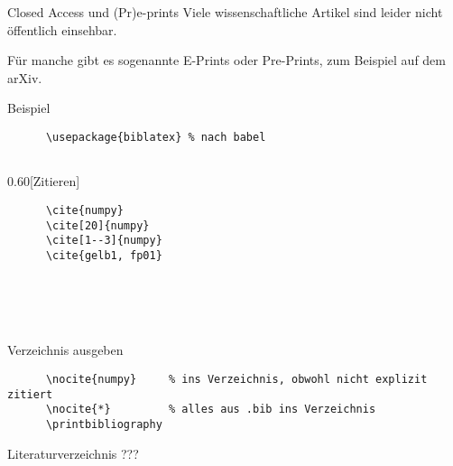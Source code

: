 \begin{frame}[fragile]{Closed Access und (Pr)e-prints}
  Viele wissenschaftliche Artikel sind leider nicht öffentlich einsehbar.

  Für manche gibt es sogenannte E-Prints oder Pre-Prints, zum Beispiel auf dem arXiv.

  \begin{block}{Beispiel}
    \footnotesize
    
  \end{block}

\end{frame}

\begin{frame}[fragile]{%
  \BibLaTeX{}%
  \hfill%
}
  \begin{Packages}
    \begin{lstlisting}
      \usepackage{biblatex} % nach babel
      
    \end{lstlisting}
  \end{Packages}
  \begin{CodeExample}{0.60}[Zitieren]
    \begin{lstlisting}
      \cite{numpy}
      \cite[20]{numpy}
      \cite[1--3]{numpy}
      \cite{gelb1, fp01}
    \end{lstlisting}
  \CodeResult
    \cite{numpy} \\
    \cite[20]{numpy} \\
    \cite[1--3]{numpy} \\
    \cite{gelb1, fp01}
  \end{CodeExample}
  \begin{block}{Verzeichnis ausgeben}
    \begin{lstlisting}
      \nocite{numpy}     % ins Verzeichnis, obwohl nicht explizit zitiert
      \nocite{*}         % alles aus .bib ins Verzeichnis
      \printbibliography
    \end{lstlisting}
  \end{block}
\end{frame}

\begin{frame}{Literaturverzeichnis}
  \centering
  \pause
  \Huge ???
\end{frame}

